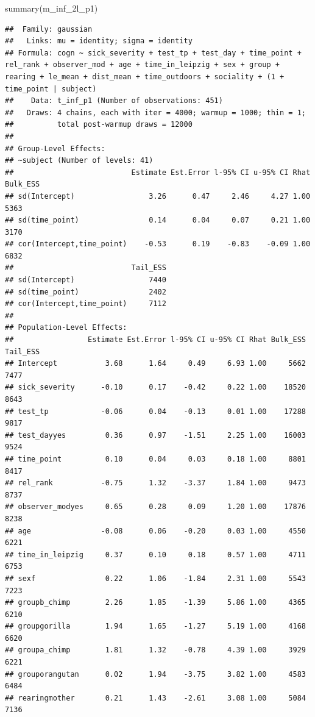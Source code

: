 \documentclass[
]{article}
\newenvironment{Shaded}{\begin{snugshade}}{\end{snugshade}}
\newcommand{\FunctionTok}[1]{\textcolor[rgb]{0.00,0.00,0.00}{#1}}
\newcommand{\NormalTok}[1]{#1}
\begin{document}
\begin{Shaded}
\begin{Highlighting}[]
\FunctionTok{summary}\NormalTok{(m\_inf\_2l\_p1)}
\end{Highlighting}
\end{Shaded}

\begin{verbatim}
##  Family: gaussian 
##   Links: mu = identity; sigma = identity 
## Formula: cogn ~ sick_severity + test_tp + test_day + time_point + rel_rank + observer_mod + age + time_in_leipzig + sex + group + rearing + le_mean + dist_mean + time_outdoors + sociality + (1 + time_point | subject) 
##    Data: t_inf_p1 (Number of observations: 451) 
##   Draws: 4 chains, each with iter = 4000; warmup = 1000; thin = 1;
##          total post-warmup draws = 12000
## 
## Group-Level Effects: 
## ~subject (Number of levels: 41) 
##                           Estimate Est.Error l-95% CI u-95% CI Rhat Bulk_ESS
## sd(Intercept)                 3.26      0.47     2.46     4.27 1.00     5363
## sd(time_point)                0.14      0.04     0.07     0.21 1.00     3170
## cor(Intercept,time_point)    -0.53      0.19    -0.83    -0.09 1.00     6832
##                           Tail_ESS
## sd(Intercept)                 7440
## sd(time_point)                2402
## cor(Intercept,time_point)     7112
## 
## Population-Level Effects: 
##                 Estimate Est.Error l-95% CI u-95% CI Rhat Bulk_ESS Tail_ESS
## Intercept           3.68      1.64     0.49     6.93 1.00     5662     7477
## sick_severity      -0.10      0.17    -0.42     0.22 1.00    18520     8643
## test_tp            -0.06      0.04    -0.13     0.01 1.00    17288     9817
## test_dayyes         0.36      0.97    -1.51     2.25 1.00    16003     9524
## time_point          0.10      0.04     0.03     0.18 1.00     8801     8417
## rel_rank           -0.75      1.32    -3.37     1.84 1.00     9473     8737
## observer_modyes     0.65      0.28     0.09     1.20 1.00    17876     8238
## age                -0.08      0.06    -0.20     0.03 1.00     4550     6221
## time_in_leipzig     0.37      0.10     0.18     0.57 1.00     4711     6753
## sexf                0.22      1.06    -1.84     2.31 1.00     5543     7223
## groupb_chimp        2.26      1.85    -1.39     5.86 1.00     4365     6210
## groupgorilla        1.94      1.65    -1.27     5.19 1.00     4168     6620
## groupa_chimp        1.81      1.32    -0.78     4.39 1.00     3929     6221
## grouporangutan      0.02      1.94    -3.75     3.82 1.00     4583     6484
## rearingmother       0.21      1.43    -2.61     3.08 1.00     5084     7136

\end{verbatim}
\end{document}

